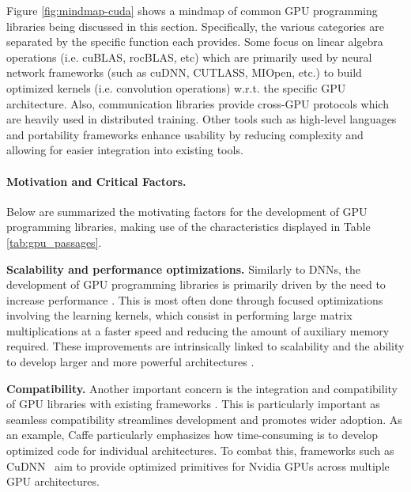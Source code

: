 Figure \ref{fig:mindmap-cuda} shows a mindmap of common GPU programming libraries being discussed
in this section. Specifically, the various categories are separated by the specific function each
provides. Some focus on linear algebra operations (i.e. cuBLAS, rocBLAS, etc) which are primarily
used by neural network frameworks (such as cuDNN, CUTLASS, MIOpen, etc.) to build optimized kernels
(i.e. convolution operations) w.r.t. the specific GPU architecture. Also, communication libraries
provide cross-GPU protocols which are heavily used in distributed training. Other tools such as
high-level languages and portability frameworks enhance usability by reducing complexity and
allowing for easier integration into existing tools.

\paragraph{Motivation and Critical Factors.}
Below are summarized the motivating factors for the development of GPU programming libraries,
making use of the characteristics displayed in Table \ref{tab:gpu_passages}.

\textbf{Scalability and performance optimizations.}
Similarly to DNNs, the development of GPU programming libraries is primarily driven by the need to increase
performance . This is most often done through focused optimizations %
involving the learning kernels, which consist in performing large matrix multiplications at a
faster speed and reducing the amount of auxiliary memory required. These improvements are
intrinsically linked to scalability and the ability to develop larger and more powerful
architectures . %

\textbf{Compatibility.}
Another important concern is the integration and compatibility of GPU libraries with existing
frameworks . This is particularly important as seamless
compatibility streamlines development and promotes wider adoption. As an example, Caffe
\cite{Jia.EtAl_2014a} particularly emphasizes how time-consuming is to develop optimized code for
individual architectures. To combat this, frameworks such as CuDNN~\cite{chetlur_cudnn_2014} aim
to provide optimized primitives for Nvidia GPUs across multiple GPU architectures.

